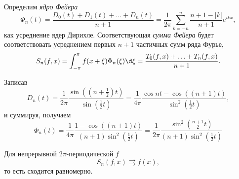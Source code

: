 


\begin{to_def}
    Определим \textit{ядро Фейера} 
    \begin{equation*}
        \Phi_n (t) = 
        \frac{D_0 (t) + D_1 (t) + \ldots + D_n (t)}{n+1} = 
        \frac{1}{2\pi} \sum_{k=-n}^{n} 
        \frac{n+1 - |k|}{n+1} e^{ikx},
    \end{equation*}
    как усреднение ядер Дирихле. Соответствующая \textit{сумма Фейера} будет соответствовать усреднением первых $n+1$ частичных сумм ряда Фурье,
    \begin{equation*}
        S_n (f, x) = \int_{-\pi}^{\pi} 
        f(x+\xi) \Phi_n (\xi) \d \xi = 
        \frac{T_0 (f, x) + \ldots + T_n (f, x)}{n+1}.
    \end{equation*}
\end{to_def}

Записав
\begin{equation*}
    D_n (t) 
    =
    \frac{1}{2\pi}
     \frac{\sin \left( \left(n + \frac{1}{2}\right)t\right)}{\sin \left(\frac{1}{2} t\right)} 
     = 
     \frac{1}{4\pi}
    \frac{
    \cos nt - \cos \left((n+1)t\right)
    }{
    \sin^2 \left(\frac{1}{2}t\right)
    },
\end{equation*}
и суммируя, получаем
\begin{equation*}
    \Phi_n (t) = 
    \frac{1}{4 \pi}
    \frac{
        1 - \cos \left((n+1)t\right)
    }{
        (n+1) \sin^2 \left(\frac{1}{2}t\right)
    }
    =
    \frac{1}{2\pi}
    \frac{
        \sin^2 \left(
            \frac{n+1}{2}t
        \right)
    }{
        (n+1) \sin^2 \left(\frac{1}{2}t\right)
    }
\end{equation*}


\begin{to_thr}
    Для непрерывной $2\pi$-периодической $f$ 
    \begin{equation*}
        S_n (f, x) \rightrightarrows f(x),
    \end{equation*}
    то есть сходится равномерно.
\end{to_thr}

